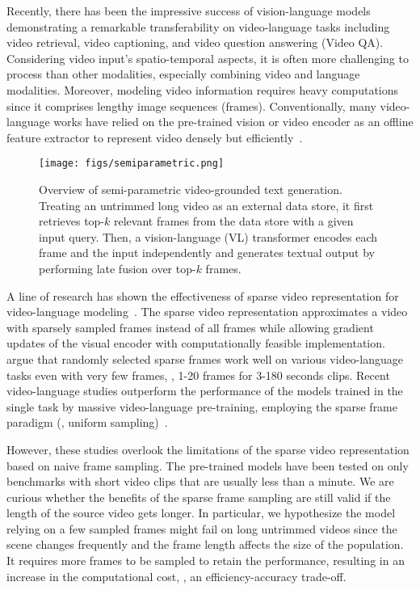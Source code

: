 \documentclass{article}
\begin{document}
Recently, there has been the impressive success of vision-language models~\cite{lu2019vilbert, radford2021learning, li2022blip, alayrac2022flamingo} demonstrating a remarkable transferability on video-language tasks including video retrieval, video captioning, and video question answering (Video QA). Considering video input's spatio-temporal aspects, it is often more challenging to process than other modalities, especially combining video and language modalities. Moreover, modeling video information requires heavy computations since it comprises lengthy image sequences (frames). Conventionally, many video-language works have relied on the pre-trained vision or video encoder as an offline feature extractor to represent video densely but efficiently~\cite{sun2019videobert, li2020hero, yang2021just}.

\begin{figure}[t!] 
\centering
\texttt{[image: figs/semiparametric.png]}
\caption{Overview of semi-parametric video-grounded text generation. Treating an untrimmed long video as an external data store, it first retrieves top-$k$ relevant frames from the data store with a given input query. Then, a vision-language (VL) transformer encodes each frame and the input independently and generates textual output by performing late fusion over top-$k$ frames.}
\label{fig:motivation}
\vspace{-2mm}
\end{figure}

A line of research has shown the effectiveness of sparse video representation for video-language modeling~\cite{lei2021less}. The sparse video representation approximates a video with sparsely sampled frames instead of all frames while allowing gradient updates of the visual encoder with computationally feasible implementation. \citet{lei2021less} argue that randomly selected sparse frames work well on various video-language tasks even with very few frames, \eg, 1-20 frames for 3-180 seconds clips. Recent video-language studies outperform the performance of the models trained in the single task by massive video-language pre-training, employing the sparse frame paradigm (\eg, uniform sampling)~\cite{zellers2021merlot, wang2022all, zellers2022merlot, yang2022zero}.


However, these studies overlook the limitations of the sparse video representation based on naive frame sampling. The pre-trained models have been tested on only benchmarks with short video clips that are usually less than a minute. We are curious whether the benefits of the sparse frame sampling are still valid if the length of the source video gets longer. In particular, we hypothesize the model relying on a few sampled frames might fail on long untrimmed videos since the scene changes frequently and the frame length affects the size of the population. It requires more frames to be sampled to retain the performance, resulting in an increase in the computational cost, \ie, an efficiency-accuracy trade-off.
\end{document}
